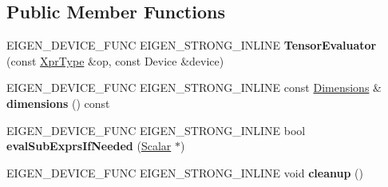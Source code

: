 \subsection*{Public Member Functions}
\begin{DoxyCompactItemize}
\item 
\mbox{\label{struct_eigen_1_1_tensor_evaluator_3_01const_01_tensor_image_patch_op_3_01_rows_00_01_cols_00_01_arg_type_01_4_00_01_device_01_4_a070b037b38a728a1651e7eb845a96940}} 
E\+I\+G\+E\+N\+\_\+\+D\+E\+V\+I\+C\+E\+\_\+\+F\+U\+NC E\+I\+G\+E\+N\+\_\+\+S\+T\+R\+O\+N\+G\+\_\+\+I\+N\+L\+I\+NE {\bfseries Tensor\+Evaluator} (const \hyperlink{class_eigen_1_1_tensor_image_patch_op}{Xpr\+Type} \&op, const Device \&device)
\item 
\mbox{\label{struct_eigen_1_1_tensor_evaluator_3_01const_01_tensor_image_patch_op_3_01_rows_00_01_cols_00_01_arg_type_01_4_00_01_device_01_4_abbfbc72a73b0470be0e44787a74a4898}} 
E\+I\+G\+E\+N\+\_\+\+D\+E\+V\+I\+C\+E\+\_\+\+F\+U\+NC E\+I\+G\+E\+N\+\_\+\+S\+T\+R\+O\+N\+G\+\_\+\+I\+N\+L\+I\+NE const \hyperlink{struct_eigen_1_1_d_sizes}{Dimensions} \& {\bfseries dimensions} () const
\item 
\mbox{\label{struct_eigen_1_1_tensor_evaluator_3_01const_01_tensor_image_patch_op_3_01_rows_00_01_cols_00_01_arg_type_01_4_00_01_device_01_4_a6afe7a9f7849bed583a3b0f0ab38b0e7}} 
E\+I\+G\+E\+N\+\_\+\+D\+E\+V\+I\+C\+E\+\_\+\+F\+U\+NC E\+I\+G\+E\+N\+\_\+\+S\+T\+R\+O\+N\+G\+\_\+\+I\+N\+L\+I\+NE bool {\bfseries eval\+Sub\+Exprs\+If\+Needed} (\hyperlink{group___sparse_core___module}{Scalar} $\ast$)
\item 
\mbox{\label{struct_eigen_1_1_tensor_evaluator_3_01const_01_tensor_image_patch_op_3_01_rows_00_01_cols_00_01_arg_type_01_4_00_01_device_01_4_ae2c9d607ff9933915151feeeb0ef4ed7}} 
E\+I\+G\+E\+N\+\_\+\+D\+E\+V\+I\+C\+E\+\_\+\+F\+U\+NC E\+I\+G\+E\+N\+\_\+\+S\+T\+R\+O\+N\+G\+\_\+\+I\+N\+L\+I\+NE void {\bfseries cleanup} ()

\end{DoxyCompactItemize}
